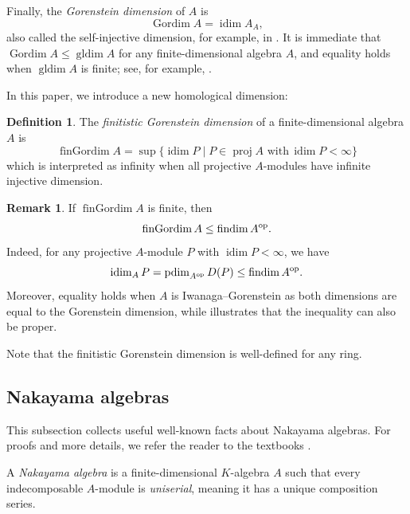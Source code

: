 \documentclass[a4paper]{amsart}
\theoremstyle{definition}
\newtheorem{definition}[theorem]{Definition}
\newtheorem{remark}[theorem]{Remark}
\theoremstyle{remark}
\numberwithin{equation}{theorem}
\newcommand{\Dfn}[1]{\emph{\color{blue}#1}} %
\newcommand{\findim}{\operatorname{findim}}
\newcommand{\proj}{\operatorname{proj}}
\newcommand{\gordim}{\operatorname{Gordim}}
\newcommand{\fingordim}{\operatorname{finGordim}}
\newcommand{\idim}{\operatorname{idim}}
\newcommand{\pdim}{\operatorname{pdim}}
\newcommand{\gldim}{\operatorname{gldim}}
\newcommand{\op}{\textnormal{op}}
\newcommand{\K}{K}
\begin{document}
Finally, the \Dfn{Gorenstein dimension} of $A$ is
\[\gordim A
= \idim A_A , \]
also called the self-injective dimension, for example, in \cite{Ba}.
It is immediate that $\gordim A \leq \gldim A$ for any finite-dimensional algebra $A$, and equality holds when $ \gldim A $ is finite; see, for example, \cite[Lemma~VI.5.5]{ARS}.

In this paper, we introduce a new homological dimension:

\begin{definition}
    The \Dfn{finitistic Gorenstein dimension} of a finite-dimensional algebra $ A $ is
        \[
            \fingordim A = \sup \bigl\{ \idim P \mid P \in \proj A  \text{ with} \, \idim P < \infty \bigr\}
        \] 
    which is interpreted as infinity when all projective $ A $-modules have infinite injective dimension.
\end{definition}


\begin{remark} \label{fingordim&findim}
    If $ \fingordim A $ is finite, then
        \[
            \fingordim A \leq \findim A^\op .
        \]
    Indeed, for any projective $ A $-module $ P $ with $ \idim P < \infty $, we have
        \[
            \idim_A P = \pdim_{A^\op} D(P) \leq \findim A^\op   .
        \]
    Moreover, equality holds when $ A $ is Iwanaga--Gorenstein as both dimensions are equal to the Gorenstein dimension, while  illustrates that the inequality can also be proper.
\end{remark}

Note that the finitistic Gorenstein dimension is well-defined for any ring.

\subsection{Nakayama algebras}\label{subsec:preliminaries-nakayama}
This subsection collects useful well-known facts about Nakayama algebras.
For proofs and more details, we refer the reader to the textbooks \cite{AF,ARS,ASS,SkoYam}.

A \Dfn{Nakayama algebra} is a finite-dimensional $\K$-algebra $A$ such that every indecomposable $A$-module is \Dfn{uniserial}, meaning it has a unique composition series.
\end{document}
